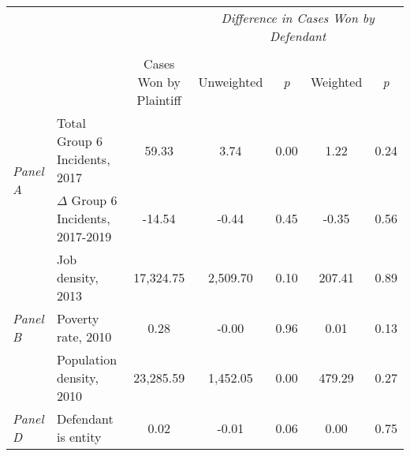 \begin{tabular}{llccccc}
\toprule
 &  & \textit{} & \multicolumn{4}{c}{\textit{Difference in Cases Won by Defendant}} \\
\cline{4-7}
\\
 &  & Cases Won by Plaintiff & Unweighted & \emph{p} & Weighted & \emph{p} \\
\midrule
\multirow[c]{2}{3cm}{\textit{Panel A}} & Total Group 6 Incidents, 2017 & 59.33 & 3.74 & 0.00 & 1.22 & 0.24 \\
 & $\Delta$ Group 6 Incidents, 2017-2019 & -14.54 & -0.44 & 0.45 & -0.35 & 0.56 \\
\cline{1-7}
\multirow[c]{3}{3cm}{\textit{Panel B}} & Job density, 2013 & 17,324.75 & 2,509.70 & 0.10 & 207.41 & 0.89 \\
 & Poverty rate, 2010 & 0.28 & -0.00 & 0.96 & 0.01 & 0.13 \\
 & Population density, 2010 & 23,285.59 & 1,452.05 & 0.00 & 479.29 & 0.27 \\
\cline{1-7}
\textit{Panel D} & Defendant is entity & 0.02 & -0.01 & 0.06 & 0.00 & 0.75 \\
\cline{1-7}
\bottomrule
\end{tabular}
